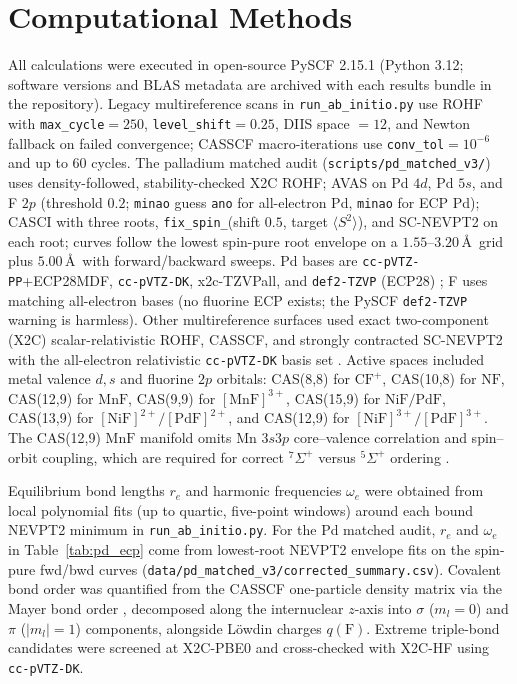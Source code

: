\documentclass[10pt,twocolumn]{article}
\begin{document}
\section{Computational Methods}
All calculations were executed in open-source PySCF 2.15.1 \cite{sun2020} (Python 3.12; software versions and BLAS metadata are archived with each results bundle in the repository). Legacy multireference scans in \texttt{run\_ab\_initio.py} use ROHF with \texttt{max\_cycle}$=250$, \texttt{level\_shift}$=0.25$, DIIS space $=12$, and Newton fallback on failed convergence; CASSCF macro-iterations use \texttt{conv\_tol}$=10^{-6}$ and up to $60$ cycles. The palladium matched audit (\texttt{scripts/pd\_matched\_v3/}) uses density-followed, stability-checked X2C ROHF; AVAS on Pd $4d$, Pd $5s$, and F $2p$ (threshold $0.2$; \texttt{minao} guess \texttt{ano} for all-electron Pd, \texttt{minao} for ECP Pd); CASCI with three roots, \texttt{fix\_spin\_}(shift $0.5$, target $\langle S^2\rangle$), and SC-NEVPT2 on each root; curves follow the lowest spin-pure root envelope on a $1.55$--$3.20\,$\AA\ grid plus $5.00\,$\AA\ with forward/backward sweeps. Pd bases are \texttt{cc-pVTZ-PP}+ECP28MDF, \texttt{cc-pVTZ-DK}, x2c-TZVPall, and \texttt{def2-TZVP} (ECP28) \cite{peterson2007,weigend2005,andrae1990,pollak2017}; F uses matching all-electron bases (no fluorine ECP exists; the PySCF \texttt{def2-TZVP} warning is harmless). Other multireference surfaces used exact two-component (X2C) scalar-relativistic ROHF, CASSCF, and strongly contracted SC-NEVPT2 \cite{angeli2001} with the all-electron relativistic \texttt{cc-pVTZ-DK} basis set \cite{balabanov2005}. Active spaces included metal valence $d,s$ and fluorine $2p$ orbitals: CAS(8,8) for $\mathrm{CF}^+$, CAS(10,8) for $\mathrm{NF}$, CAS(12,9) for $\mathrm{MnF}$, CAS(9,9) for $[\mathrm{MnF}]^{3+}$, CAS(15,9) for $\mathrm{NiF}/\mathrm{PdF}$, CAS(13,9) for $[\mathrm{NiF}]^{2+}/[\mathrm{PdF}]^{2+}$, and CAS(12,9) for $[\mathrm{NiF}]^{3+}/[\mathrm{PdF}]^{3+}$. The CAS(12,9) $\mathrm{MnF}$ manifold omits Mn $3s3p$ core--valence correlation and spin--orbit coupling, which are required for correct $^7\Sigma^+$ versus $^5\Sigma^+$ ordering \cite{koukounas2004}.

Equilibrium bond lengths $r_e$ and harmonic frequencies $\omega_e$ were obtained from local polynomial fits (up to quartic, five-point windows) around each bound NEVPT2 minimum in \texttt{run\_ab\_initio.py}. For the Pd matched audit, $r_e$ and $\omega_e$ in Table~\ref{tab:pd_ecp} come from lowest-root NEVPT2 envelope fits on the spin-pure fwd/bwd curves (\texttt{data/pd\_matched\_v3/corrected\_summary.csv}). Covalent bond order was quantified from the CASSCF one-particle density matrix via the Mayer bond order \cite{mayer1983}, decomposed along the internuclear $z$-axis into $\sigma$ ($m_l = 0$) and $\pi$ ($|m_l| = 1$) components, alongside L\"owdin charges $q(\mathrm{F})$. Extreme triple-bond candidates were screened at X2C-PBE0 \cite{adamo1999} and cross-checked with X2C-HF using \texttt{cc-pVTZ-DK}.
\end{document}
